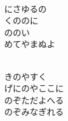 \documentclass[10pt,b5j]{tarticle} %
\begin{document}
\begin{enumerate}
\begin{minipage}[c]{\blocksize}
        \vspace{\linespace}
        \item~\\
        にさゆるの\\
        くののに\\
        ののい\\
        めてやまぬよ
        
        \vspace{\linespace}
        \item~\\
        きのやすく\\
        げにのやここに\\
        のぞただよへる\\
        のぞみなぎれる
    
    \end{minipage}
\end{enumerate} %
\end{document}
